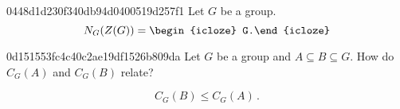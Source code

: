 \begin{note}{0448d1d230f340db94d0400519d257f1}
    Let \({ G }\) be a group.
    \[
        N_G (Z(G)) = \begin{icloze}{1}G.\end{icloze}
    \]
\end{note}

\begin{note}{0d151553fc4c40c2ae19df1526b809da}
    Let \({ G }\) be a group and \({ A \subseteq B \subseteq G }\).
    How do \({ C_G(A) }\) and \({ C_G(B) }\) relate?

    \begin{cloze}{1}
        \[
            C_G(B) \leq C_G(A)\,.
        \]
    \end{cloze}
\end{note}


